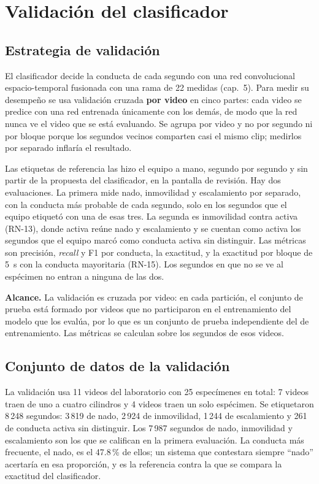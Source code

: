 \FloatBarrier

\section{Validación del clasificador}
\label{sec:pruebas_clasificador}

\subsection{Estrategia de validación}

El clasificador decide la conducta de cada segundo con una red convolucional
espacio-temporal fusionada con una rama de 22 medidas (cap.~5). Para medir su
desempeño se usa validación cruzada \textbf{por video} en cinco partes: cada video se
predice con una red entrenada únicamente con los demás, de modo que la red nunca ve el
video que se está evaluando. Se agrupa por video y no por segundo ni por bloque porque
los segundos vecinos comparten casi el mismo clip; medirlos por separado inflaría el
resultado.

Las etiquetas de referencia las hizo el equipo a mano, segundo por segundo y sin partir
de la propuesta del clasificador, en la pantalla de revisión. Hay dos evaluaciones. La
primera mide nado, inmovilidad y escalamiento por separado, con la conducta más probable
de cada segundo, solo en los segundos que el equipo etiquetó con una de esas tres. La
segunda es inmovilidad contra activa (RN-13), donde activa reúne nado y escalamiento y
se cuentan como activa los segundos que el equipo marcó como conducta activa sin
distinguir. Las métricas son precisión, \textit{recall} y F1 por conducta, la exactitud, y
la exactitud por bloque de 5~s con la conducta mayoritaria (RN-15). Los segundos en que
no se ve al espécimen no entran a ninguna de las dos.

\textbf{Alcance.} La validación es cruzada por video: en cada partición, el conjunto de prueba está formado por videos que no participaron en el entrenamiento del modelo que los evalúa, por lo que es un conjunto de prueba independiente del de entrenamiento. Las métricas se calculan sobre los segundos de esos videos.

\subsection{Conjunto de datos de la validación}

La validación usa 11 videos del laboratorio con 25 especímenes en total: 7 videos traen
de uno a cuatro cilindros y 4 videos traen un solo espécimen. Se etiquetaron 8\,248
segundos: 3\,819 de nado, 2\,924 de inmovilidad, 1\,244 de escalamiento y 261 de
conducta activa sin distinguir. Los 7\,987 segundos de nado, inmovilidad y escalamiento
son los que se califican en la primera evaluación. La conducta más frecuente, el nado, es el 47.8\,\% de
ellos; un sistema que contestara siempre ``nado'' acertaría en esa proporción, y es la
referencia contra la que se compara la exactitud del clasificador.


